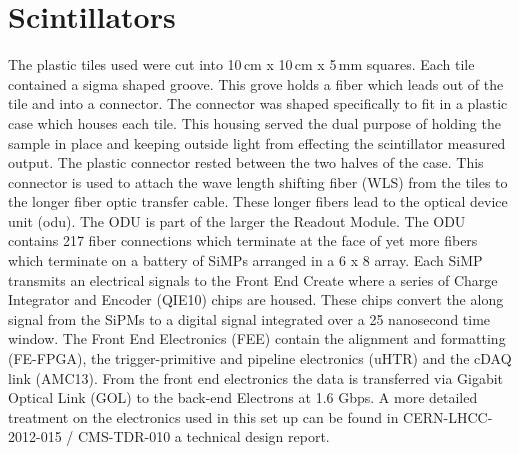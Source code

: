 \documentclass[review]{elsarticle}
\begin{document}
\section{Scintillators}
\label{sec:scintillators}

The plastic tiles used were cut into 10\,cm x 10\,cm x 5\,mm squares. 
Each tile contained a sigma shaped groove. 
This grove holds a fiber which leads out of the tile and into a connector. 
The connector was shaped specifically to fit in a plastic case which houses each tile. 
This housing served the dual purpose of holding the sample in place and keeping outside light from effecting the scintillator measured output. 
The plastic connector rested between the two halves of the case. 
This connector is used to attach the wave length shifting fiber (WLS) from the tiles to the longer fiber optic transfer cable. 
These longer fibers lead to the optical device unit (odu). 
The ODU is part of the larger the Readout Module. 
The ODU contains 217 fiber connections which terminate at the face of yet more fibers which terminate on a battery of SiMPs arranged in a 6 x 8 array. 
Each SiMP transmits an electrical signals to the Front End Create where a series of Charge Integrator and Encoder (QIE10) chips are housed. 
These chips convert the along signal from the SiPMs to a digital signal integrated over a 25 nanosecond time window. 
The Front End Electronics (FEE) contain the alignment and formatting (FE-FPGA), the trigger-primitive and pipeline electronics (uHTR) and the cDAQ link (AMC13). 
From the front end electronics the data is transferred via  Gigabit Optical Link (GOL) to the back-end Electrons at 1.6 Gbps. 
A more detailed treatment on the electronics used in this set up can be found in CERN-LHCC-2012-015 / CMS-TDR-010 a technical design report. 
\end{document}
